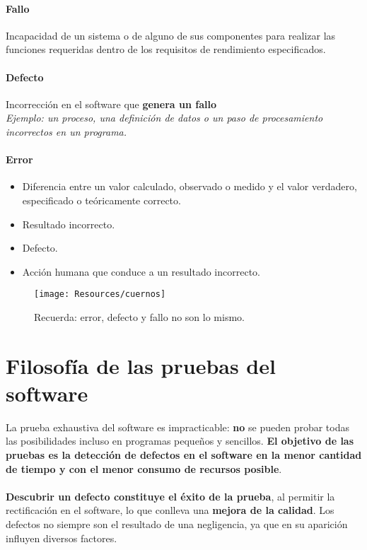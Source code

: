 %

\paragraph{Fallo} Incapacidad de un sistema o de alguno de sus componentes para realizar las funciones requeridas dentro de los requisitos de rendimiento especificados.

\paragraph{Defecto} Incorrección en el software que \textbf{genera un fallo}\\
\textit{Ejemplo: un proceso, una definición de datos o un paso de procesamiento incorrectos en un programa.}
\paragraph{Error}
\begin{itemize}
    \item Diferencia entre un valor calculado, observado o medido y el valor verdadero, especificado o teóricamente correcto.
    \item Resultado incorrecto.
    \item Defecto.
    \item Acción humana que conduce a un resultado incorrecto.
\end{itemize}

\begin{figure}[H]
    \centering
    \texttt{[image: Resources/cuernos]}
    \caption{Recuerda: error, defecto y fallo no son lo mismo.}
    \label{fig:cuernos}
\end{figure}


\section{Filosofía de las pruebas del software}
La prueba exhaustiva del software es impracticable: \textbf{no} se pueden probar todas las posibilidades incluso en programas pequeños y sencillos. \textbf{El objetivo de las pruebas es la detección de defectos en el software en la menor cantidad de tiempo y con el menor consumo de recursos posible}.\\\\
\textbf{Descubrir un defecto constituye el éxito de la prueba}, al permitir la rectificación en el software, lo que conlleva una \textbf{mejora de la calidad}. Los defectos no siempre son el resultado de una negligencia, ya que en su aparición influyen diversos factores.

